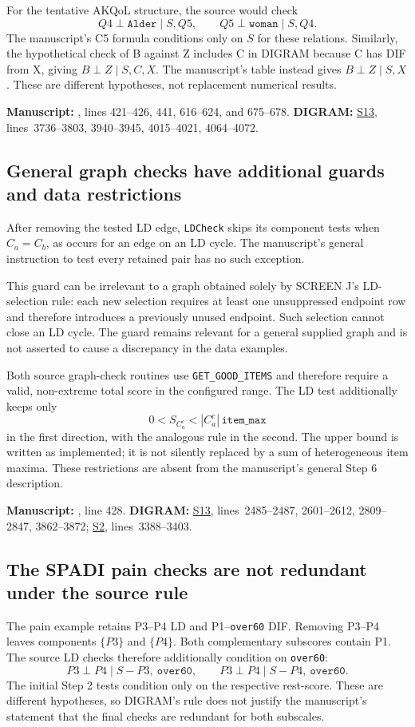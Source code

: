 \documentclass[11pt,a4paper]{article}
\newcommand{\ind}{\perp}
\newcommand{\src}[2]{\hyperlink{source-#1}{\textsf{#1}}, lines~#2}
\newcommand{\trace}[2]{%
  \par\smallskip
  {\footnotesize\color{tracegray}\textbf{Manuscript:} #1.\quad
  \textbf{DIGRAM:} #2.\par}\medskip}
\newcommand{\finding}[1]{\Needspace{5\baselineskip}\subsection{#1}}
\begin{document}
For the tentative AKQoL structure, the source would check
\[
 Q4\ind\texttt{Alder}\mid S,Q5,\qquad
 Q5\ind\texttt{woman}\mid S,Q4.
\]
The manuscript's C5 formula conditions only on \(S\) for these relations.
Similarly, the hypothetical check of B against Z includes C in DIGRAM
because C has DIF from X, giving \(B\ind Z\mid S,C,X\).
The manuscript's table instead gives \(B\ind Z\mid S,X\).
These are different hypotheses, not replacement numerical results.
\trace{, lines 421--426, 441, 616--624, and 675--678}
{\src{S13}{3736--3803, 3940--3945, 4015--4021, 4064--4072}}

\finding{General graph checks have additional guards and data restrictions}
After removing the tested LD edge, \texttt{LDCheck} skips its component
tests when \(C_a=C_b\), as occurs for an edge on an LD cycle.
The manuscript's general instruction to test every retained pair has
no such exception.

This guard can be irrelevant to a graph obtained solely by SCREEN J's
LD-selection rule: each new selection requires at least one unsuppressed
endpoint row and therefore introduces a previously unused endpoint.
Such selection cannot close an LD cycle.
The guard remains relevant for a general supplied graph and is not asserted
to cause a discrepancy in the data examples.

Both source graph-check routines use \texttt{GET\_GOOD\_ITEMS} and therefore
require a valid, non-extreme total score in the configured range.
The LD test additionally keeps only
\[
 0<S_{C_a^c}<|C_a^c|\,\texttt{item\_max}
\]
in the first direction, with the analogous rule in the second.
The upper bound is written as implemented; it is not silently replaced by
a sum of heterogeneous item maxima. These restrictions are absent from the
manuscript's general Step 6 description.
\trace{, line 428}
{\src{S13}{2485--2487, 2601--2612, 2809--2847, 3862--3872};
 \src{S2}{3388--3403}}

\finding{The SPADI pain checks are not redundant under the source rule}
The pain example retains P3--P4 LD and P1--\texttt{over60} DIF.
Removing P3--P4 leaves components \(\{P3\}\) and \(\{P4\}\).
Both complementary subscores contain P1. The source LD checks therefore
additionally condition on \texttt{over60}:
\[
 P3\ind P4\mid S-P3,\ \texttt{over60},\qquad
 P3\ind P4\mid S-P4,\ \texttt{over60}.
\]
The initial Step 2 tests condition only on the respective rest-score.
These are different hypotheses, so DIGRAM's rule does not justify the
manuscript's statement that the final checks are redundant for both subscales.
\end{document}

